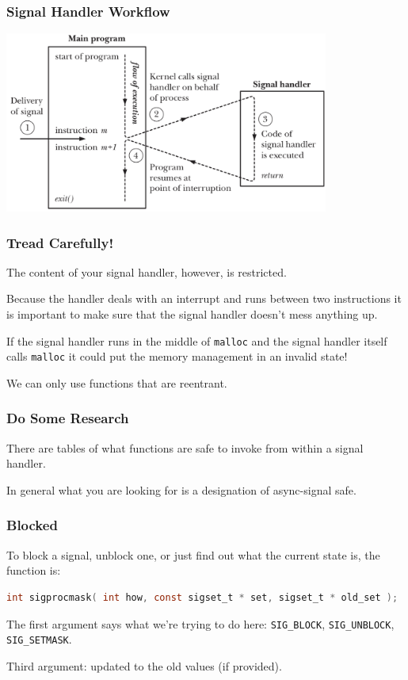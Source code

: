 \begin{frame}
	\frametitle{Signal Handler Workflow}

	\begin{center}
		\includegraphics[width=0.8\textwidth]{images/sighandler.png}
	\end{center}


\end{frame}


\begin{frame}
	\frametitle{Tread Carefully!}

	The content of your signal handler, however, is restricted.

	Because the handler deals with an interrupt and runs between two instructions it is important to make sure that the signal handler doesn't mess anything up.

	If the signal handler runs in the middle of \texttt{malloc} and the signal handler itself calls \texttt{malloc} it could put the memory management in an invalid state!

	We can only use functions that are \alert{reentrant}.


\end{frame}


\begin{frame}
	\frametitle{Do Some Research}

	There are tables of what functions are safe to invoke from within a signal handler.

	In general what you are looking for is a designation of \alert{async-signal safe}.

\end{frame}


\begin{frame}[fragile]
	\frametitle{Blocked}

	To block a signal, unblock one, or just find out what the current state is, the function is:
	\begin{lstlisting}[language=C]
int sigprocmask( int how, const sigset_t * set, sigset_t * old_set );
\end{lstlisting}

	The first argument says what we're trying to do here: \texttt{SIG\_BLOCK}, \texttt{SIG\_UNBLOCK}, \texttt{SIG\_SETMASK}.

	Third argument: updated to the old values (if provided).

\end{frame}


